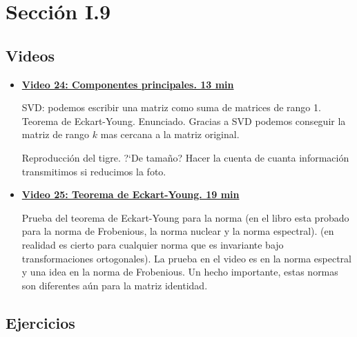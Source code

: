 \documentclass[12pt,a4paper]{article}
\newcommand\1{\mbox{\,\vrule height-0.8pt depth1.0pt width2pc\,}}
\newcommand\2{\mbox{\,\vrule height-0.8pt depth1.0pt width1pc\,}}
\begin{document}
\section{Sección I.9}

\subsection*{Videos}

\begin{itemize}
   \item       \href{https://youtu.be/4sDhapuTXZQ}{\bf Video 24:  Componentes principales.   13 min} 
     
     SVD: podemos escribir una matriz como suma de matrices de rango 1. Teorema de Eckart-Young. Enunciado. Gracias a SVD podemos conseguir la matriz de rango $k$ mas cercana a la matriz original. 
     
     Reproducci\'on del tigre. ?`De tama\~no? Hacer la cuenta de cuanta informaci\'on transmitimos si reducimos la foto.
     
       \item       \href{https://youtu.be/5Pc2umjAkGQ}{\bf Video 25:   Teorema de Eckart-Young. 19 min} 
       
       
       Prueba del teorema de Eckart-Young para la norma (en el libro esta probado para la norma de Frobenious, la norma nuclear y la norma espectral). 
       (en realidad es cierto para cualquier norma que es invariante bajo transformaciones ortogonales). La prueba en el video es en la norma espectral y una idea en la norma de Frobenious. Un hecho importante, estas normas son diferentes a\'un para la matriz identidad. 
       
       
         
\end{itemize}

\subsection*{Ejercicios}
\end{document}
